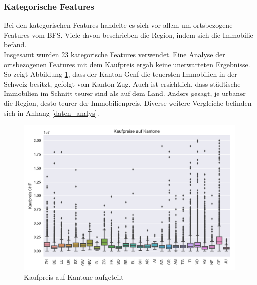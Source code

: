 \subsubsection{Kategorische Features}
Bei den kategorischen Features handelte es sich vor allem um ortsbezogene Features vom BFS. Viele davon beschrieben die Region, indem sich die Immobilie befand.\\
Insgesamt wurden 23 kategorische Features verwendet. Eine Analyse der ortsbezogenen Features mit dem Kaufpreis ergab keine unerwarteten Ergebnisse. So zeigt Abbildung \ref{fig:cantons}, dass der Kanton Genf die teuersten Immobilien in der Schweiz besitzt, gefolgt vom Kanton Zug. Auch ist ersichtlich, dass städtische Immobilien im Schnitt teurer sind als auf dem Land. Anders gesagt, je urbaner die Region, desto teurer der Immobilienpreis. Diverse weitere Vergleiche befinden sich in Anhang \ref{daten_analys}.\\[2ex]
\begin{figure}[ht]
\centering
\includegraphics[width=\textwidth]{images/boxPlot_cantons.png}
\caption[Kaufpreis auf Kantone aufgeteilt]{Kaufpreis auf Kantone aufgeteilt}%
\label{fig:cantons}
\end{figure}

